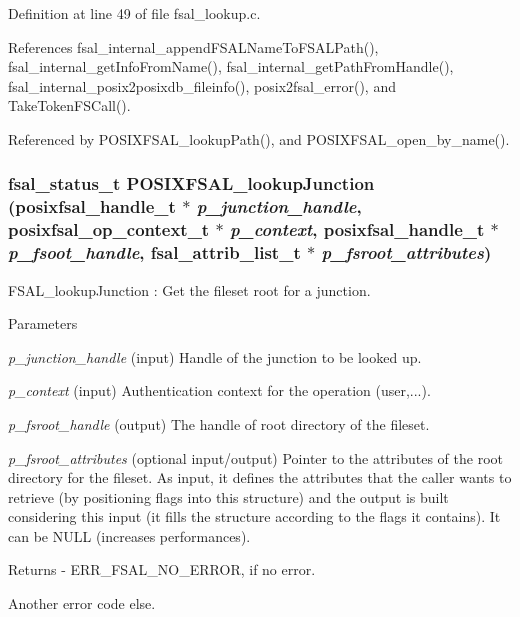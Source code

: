 Definition at line 49 of file fsal\_\-lookup.c.

References fsal\_\-internal\_\-appendFSALNameToFSALPath(), fsal\_\-internal\_\-getInfoFromName(), fsal\_\-internal\_\-getPathFromHandle(), fsal\_\-internal\_\-posix2posixdb\_\-fileinfo(), posix2fsal\_\-error(), and TakeTokenFSCall().

Referenced by POSIXFSAL\_\-lookupPath(), and POSIXFSAL\_\-open\_\-by\_\-name().
\subsubsection[{POSIXFSAL\_\-lookupJunction}]{\setlength{\rightskip}{0pt plus 5cm}fsal\_\-status\_\-t POSIXFSAL\_\-lookupJunction (posixfsal\_\-handle\_\-t $\ast$ {\em p\_\-junction\_\-handle}, \/  posixfsal\_\-op\_\-context\_\-t $\ast$ {\em p\_\-context}, \/  posixfsal\_\-handle\_\-t $\ast$ {\em p\_\-fsoot\_\-handle}, \/  fsal\_\-attrib\_\-list\_\-t $\ast$ {\em p\_\-fsroot\_\-attributes})}\label{fsal__lookup_8c_a00e9d409b15c29b741b594366cece02b}
FSAL\_\-lookupJunction : Get the fileset root for a junction.


\begin{DoxyParams}{Parameters}
\item[{\em p\_\-junction\_\-handle}](input) Handle of the junction to be looked up. \item[{\em p\_\-context}](input) Authentication context for the operation (user,...). \item[{\em p\_\-fsroot\_\-handle}](output) The handle of root directory of the fileset. \item[{\em p\_\-fsroot\_\-attributes}](optional input/output) Pointer to the attributes of the root directory for the fileset. As input, it defines the attributes that the caller wants to retrieve (by positioning flags into this structure) and the output is built considering this input (it fills the structure according to the flags it contains). It can be NULL (increases performances).\end{DoxyParams}
\begin{DoxyReturn}{Returns}
-\/ ERR\_\-FSAL\_\-NO\_\-ERROR, if no error.
\begin{DoxyItemize}
\item Another error code else. 
\end{DoxyItemize}
\end{DoxyReturn}


